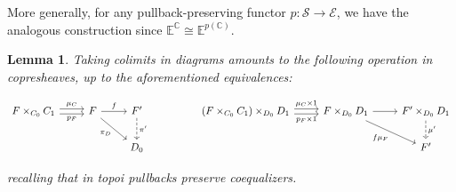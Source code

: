 \documentclass[10pt, oneside]{article}
\newtheorem{lemma}[theorem]{Lemma}
\begin{document}
More generally, for any pullback-preserving functor $p: \mathcal{S} \to \mathcal{E}$, we have the analogous construction since $\mathbb{E}^\mathbb{C} \cong  \mathbb{E}^{p{(\mathbb{C})}}$.


\begin{lemma}
    Taking colimits in diagrams amounts to the following operation  in copresheaves, up to the aforementioned equivalences:

    \[\begin{tikzcd}[ampersand replacement=\&]
	{F \times_{C_0} C_1} \& F \& {F^\prime} \&\& {(F \times_{C_0} C_1) \times_{D_0} D_1} \& {F \times_{D_0} D_1} \& {F^\prime \times_{D_0} D_1} \\
	\&\& {D_0} \&\&\&\& {F^\prime}
	\arrow["{\mu_C}", shift left=1, from=1-1, to=1-2]
	\arrow["{p_F}"', shift right=1, from=1-1, to=1-2]
	\arrow["f", from=1-2, to=1-3]
	\arrow["{\pi_D}"', from=1-2, to=2-3]
	\arrow["{\pi^\prime}", dashed, from=1-3, to=2-3]
	\arrow["{\mu_C \times 1}", shift left=1, from=1-5, to=1-6]
	\arrow["{f\mu_F}"', from=1-6, to=2-7]
	\arrow["{p_F \times 1}"', shift right=1, from=1-5, to=1-6]
	\arrow[from=1-6, to=1-7]
	\arrow["{\mu^\prime}", dashed, from=1-7, to=2-7]
\end{tikzcd}\]
    
    \noindent recalling that in topoi pullbacks preserve coequalizers.
\end{lemma}
\end{document}
